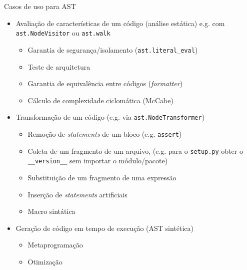 \documentclass[utf8]{beamer}
\begin{document}
\begin{frame}[fragile]{Casos de uso para AST}
  \begin{itemize}
    \item Avaliação de características de um código (análise estática)
          e.g. com \texttt{ast.NodeVisitor}
               ou \texttt{ast.walk}
      \begin{itemize}
        \item Garantia de segurança/isolamento
              (\texttt{ast.literal_eval})
        \item Teste de arquitetura
        \item Garantia de equivalência entre códigos (\emph{formatter})
        \item Cálculo de complexidade ciclomática (McCabe)
      \end{itemize}
    \item Transformação de um código
          (e.g. via \texttt{ast.NodeTransformer})
      \begin{itemize}
        \item
          Remoção de \emph{statements} de um bloco
          (e.g. \texttt{assert})
        \item
          Coleta de um fragmento de um arquivo,
          (e.g. para o \texttt{setup.py} obter
                o \texttt{__version__}
                sem importar o módulo/pacote)
        \item Substituição de um fragmento de uma expressão
        \item Inserção de \emph{statements} artificiais
        \item Macro sintática
      \end{itemize}
    \item Geração de código em tempo de execução (AST sintética)
      \begin{itemize}
        \item Metaprogramação
        \item Otimização
      \end{itemize}
  \end{itemize}
\end{frame}
\end{document}
